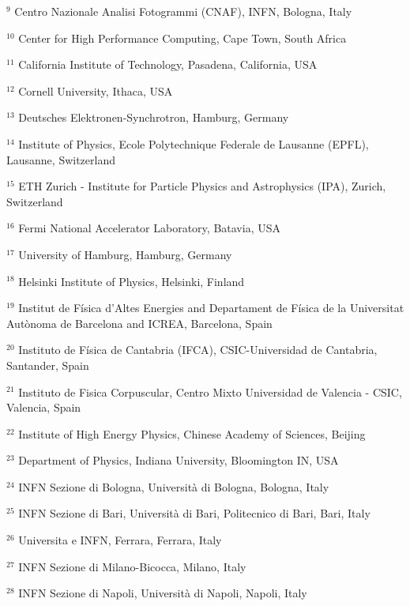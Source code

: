 \par {\footnotesize $^{9}$ Centro Nazionale Analisi Fotogrammi (CNAF), INFN, Bologna, Italy}
\par {\footnotesize $^{10}$ Center for High Performance Computing, Cape Town, South Africa}
\par {\footnotesize $^{11}$ California Institute of Technology, Pasadena, California, USA}
\par {\footnotesize $^{12}$ Cornell University, Ithaca, USA}
\par {\footnotesize $^{13}$ Deutsches Elektronen-Synchrotron, Hamburg, Germany}
\par {\footnotesize $^{14}$ Institute of Physics, Ecole Polytechnique Federale de Lausanne (EPFL), Lausanne, Switzerland}
\par {\footnotesize $^{15}$ ETH Zurich - Institute for Particle Physics and Astrophysics (IPA), Zurich, Switzerland}
\par {\footnotesize $^{16}$ Fermi National Accelerator Laboratory, Batavia, USA}
\par {\footnotesize $^{17}$ University of Hamburg, Hamburg, Germany}
\par {\footnotesize $^{18}$ Helsinki Institute of Physics, Helsinki, Finland}
\par {\footnotesize $^{19}$ Institut de Física d’Altes Energies and Departament de Física de la Universitat Autònoma de Barcelona and ICREA, Barcelona, Spain}
\par {\footnotesize $^{20}$ Instituto de Física de Cantabria (IFCA), CSIC-Universidad de Cantabria, Santander, Spain}
\par {\footnotesize $^{21}$ Instituto de Fisica Corpuscular, Centro Mixto Universidad de Valencia - CSIC, Valencia, Spain}
\par {\footnotesize $^{22}$ Institute of High Energy Physics, Chinese Academy of Sciences, Beijing}
\par {\footnotesize $^{23}$ Department of Physics, Indiana University, Bloomington IN, USA}
\par {\footnotesize $^{24}$ INFN Sezione di Bologna, Università di Bologna, Bologna, Italy}
\par {\footnotesize $^{25}$ INFN Sezione di Bari, Università di Bari, Politecnico di Bari, Bari, Italy}
\par {\footnotesize $^{26}$ Universita e INFN, Ferrara, Ferrara, Italy}
\par {\footnotesize $^{27}$ INFN Sezione di Milano-Bicocca, Milano, Italy}
\par {\footnotesize $^{28}$ INFN Sezione di Napoli, Università di Napoli, Napoli, Italy}
